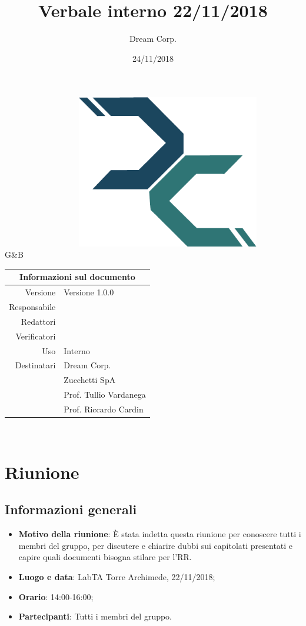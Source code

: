 \documentclass[12pt]{article}
\title{\fontsize{40}{40}\selectfont Verbale interno 22/11/2018}
\author{Dream Corp.}
\date{24/11/2018}
\newcommand{\red}{\mat}
\newcommand{\verp}{\daL}
\newcommand{\res}{\daG}
\newcommand{\version}{Versione 1.0.0}
\newcommand{\use}{Interno}
\begin{document}
\maketitle
	\begin{center}
	~~~~~~~~~~~~~~~~~~\includegraphics[width = 80mm]{../../logo.png}
	\newline
	\huge 
	\\G\&B
	
	\begin{table}[!htpb]
		\centering
		\begin{tabular}{r|l}
			\multicolumn{2}{c}{Informazioni sul documento}\\
			\hline
			Versione & \version \\
			Responsabile & \res\\
			Redattori & \red \\
			Verificatori & \verp\\
			Uso & \use\\
			Destinatari & Dream Corp. \\
			& Zucchetti SpA\\
			& Prof. Tullio Vardanega\\
			& Prof. Riccardo Cardin\\
		\end{tabular}
	\end{table}
	
	\end{center}
	\newpage

\newline
~\newline
\section{Riunione}
    \subsection{Informazioni generali}
    \begin{itemize}
        \item \textbf{Motivo della riunione}: È stata indetta questa riunione per conoscere tutti i membri del gruppo, per discutere e chiarire dubbi sui capitolati presentati e capire quali documenti bisogna stilare per l'RR.
        \item \textbf{Luogo e data}: LabTA Torre Archimede, 22/11/2018;
        \item \textbf{Orario}: 14:00-16:00;
        \item \textbf{Partecipanti}: Tutti i membri del gruppo.

    \end{itemize}
    \newpage
\end{document}
